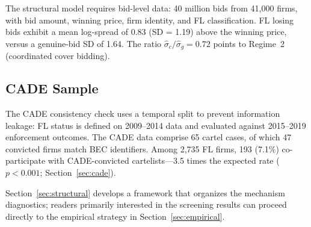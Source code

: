 The structural model requires bid-level data: 40 million bids from
41,000 firms, with bid amount, winning price, firm identity, and FL
classification. FL losing bids exhibit a mean log-spread of 0.83
(SD = 1.19) above the winning price, versus a genuine-bid SD of 1.64.
The ratio $\hat{\sigma}_c / \hat{\sigma}_g = 0.72$ points to Regime~2
(coordinated cover bidding).

\subsection{CADE Sample}
\label{sec:cade_sample}

The CADE consistency check uses a temporal split to prevent information
leakage: FL status is defined on 2009--2014 data and evaluated against
2015--2019 enforcement outcomes. The CADE data comprise 65 cartel
cases, of which 47 convicted firms match BEC identifiers. Among 2,735
FL firms, 193 (7.1\%) co-participate with CADE-convicted
cartelists---3.5 times the expected rate ($p < 0.001$;
Section~\ref{sec:cade}).

Section~\ref{sec:structural} develops a framework that organizes
the mechanism diagnostics; readers primarily interested in the
screening results can proceed directly to the empirical strategy in
Section~\ref{sec:empirical}.
